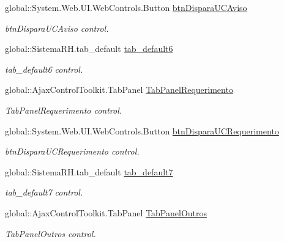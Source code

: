 \begin{DoxyCompactItemize}
global::System.Web.UI.WebControls.Button \hyperlink{class_sistema_r_h_1_1_cadastro_docs_a118d786546382312ccaa7eff9a7fdd31}{btnDisparaUCAviso}
\begin{DoxyCompactList}\small\item\em btnDisparaUCAviso control. \item\end{DoxyCompactList}\item 
global::SistemaRH.tab\_\-default \hyperlink{class_sistema_r_h_1_1_cadastro_docs_ae2f3ab74b04be41fbe19994589186f84}{tab\_\-default6}
\begin{DoxyCompactList}\small\item\em tab\_\-default6 control. \item\end{DoxyCompactList}\item 
global::AjaxControlToolkit.TabPanel \hyperlink{class_sistema_r_h_1_1_cadastro_docs_a66cbe25e89418a2dcd41996092b51088}{TabPanelRequerimento}
\begin{DoxyCompactList}\small\item\em TabPanelRequerimento control. \item\end{DoxyCompactList}\item 
global::System.Web.UI.WebControls.Button \hyperlink{class_sistema_r_h_1_1_cadastro_docs_a94141c28be0fcc27009e5bb894ca0568}{btnDisparaUCRequerimento}
\begin{DoxyCompactList}\small\item\em btnDisparaUCRequerimento control. \item\end{DoxyCompactList}\item 
global::SistemaRH.tab\_\-default \hyperlink{class_sistema_r_h_1_1_cadastro_docs_a966849510487a63bb68e107d5d841330}{tab\_\-default7}
\begin{DoxyCompactList}\small\item\em tab\_\-default7 control. \item\end{DoxyCompactList}\item 
global::AjaxControlToolkit.TabPanel \hyperlink{class_sistema_r_h_1_1_cadastro_docs_a43cf515093ff1a25c3eeaf873103cd14}{TabPanelOutros}
\begin{DoxyCompactList}\small\item\em TabPanelOutros control. \item\end{DoxyCompactList}\item 

\end{DoxyCompactItemize}
